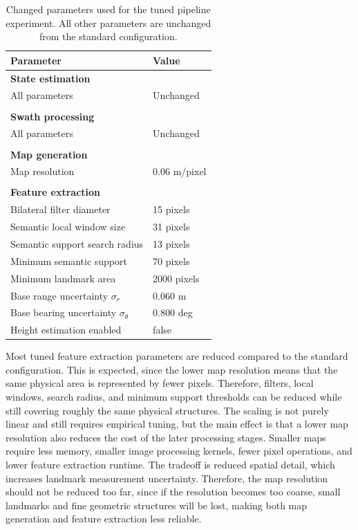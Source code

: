 \begin{table}[H]
    \centering
    \caption{Changed parameters used for the tuned pipeline experiment. All other parameters are unchanged from the standard configuration.}
    \label{tab:results-performance-tuned-parameters}
    \begin{tabular}{l l}
        \hline
        Parameter & Value \\
        \hline

        \multicolumn{2}{l}{\textbf{State estimation}} \\
        All parameters & Unchanged \\
        \\[-0.6em]

        \multicolumn{2}{l}{\textbf{Swath processing}} \\
        All parameters & Unchanged \\
        \\[-0.6em]

        \multicolumn{2}{l}{\textbf{Map generation}} \\
        Map resolution & 0.06 m/pixel \\
        \\[-0.6em]

        \multicolumn{2}{l}{\textbf{Feature extraction}} \\
        Bilateral filter diameter & 15 pixels \\
        Semantic local window size & 31 pixels \\
        Semantic support search radius & 13 pixels \\
        Minimum semantic support & 70 pixels \\
        Minimum landmark area & 2000 pixels \\
        Base range uncertainty $\sigma_r$ & 0.060 m \\
        Base bearing uncertainty $\sigma_\theta$ & 0.800 deg \\
        Height estimation enabled & false \\

        \hline
    \end{tabular}
\end{table}
\noindent
Most tuned feature extraction parameters are reduced compared to the standard configuration. This is expected, since the lower map resolution means that the same physical area is represented by fewer pixels. Therefore, filters, local windows, search radius, and minimum support thresholds can be reduced while still covering roughly the same physical structures. The scaling is not purely linear and still requires empirical tuning, but the main effect is that a lower map resolution also reduces the cost of the later processing stages. Smaller maps require less memory, smaller image processing kernels, fewer pixel operations, and lower feature extraction runtime. The tradeoff is reduced spatial detail, which increases landmark measurement uncertainty. Therefore, the map resolution should not be reduced too far, since if the resolution becomes too coarse, small landmarks and fine geometric structures will be lost, making both map generation and feature extraction less reliable.

